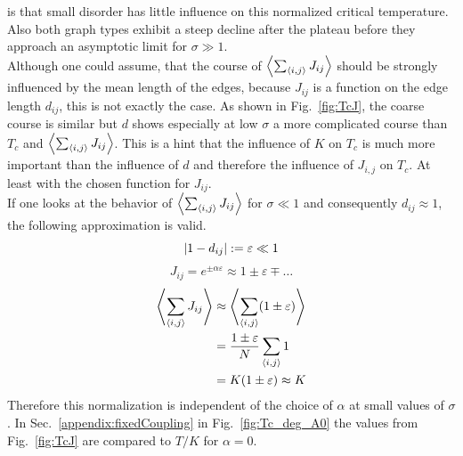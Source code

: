         is that small disorder has little influence on this normalized critical
        temperature.
        Also both graph types exhibit a steep decline after the plateau before
        they approach an asymptotic limit for \(\sigma \gg 1\).\\
        Although one could assume, that the course of \(\left< \sum_{\left< i,j \right>} J_{ij} \right>\)
        should be strongly influenced by the mean length of the edges, because \(J_{ij}\)
        is a function on the edge length \(d_{ij}\), this is not exactly the case.
        As shown in Fig.\ \ref{fig:TcJ}, the
        coarse course is similar but \(d\) shows especially at low \(\sigma\)
        a more complicated course than \(T_c\) and \(\left< \sum_{\left< i,j \right>} J_{ij} \right>\).
        This is a hint that the influence of \(K\) on \(T_c\) is much more
        important than the influence of \(d\) and therefore the influence
        of \(J_{i,j}\) on \(T_c\). At least with the chosen function for \(J_{ij}\).\\
        If one looks at the behavior of \(\left< \sum_{\left< i,j \right>} J_{ij} \right>\)
        for \(\sigma \ll 1\) and consequently \(d_{ij} \approx 1\), the
        following approximation is valid.
        \begin{equation}
            \left\vert1-d_{ij}\right\vert := \varepsilon \ll 1
        \end{equation}
        \begin{equation}
            J_{ij} = e^{\pm \alpha \varepsilon} \approx 1 \pm \varepsilon \mp \dots
        \end{equation}
        \begin{align}
            \left< \sum_{\left< i,j \right>} J_{ij} \right> &\approx \left< \sum_{\left< i,j \right>} (1 \pm \varepsilon) \right> \\
                                          &= \frac{1 \pm \varepsilon}{N} \sum_{\left< i,j \right>} 1 \\
                                          &= K(1 \pm \varepsilon) \approx K
        \end{align}
        Therefore this normalization is independent of the choice of \(\alpha\)
        at small values of \(\sigma\). In Sec.\ \ref{appendix:fixedCoupling}
        in Fig.\ \ref{fig:Tc_deg_A0}
        the values from Fig.\ \ref{fig:TcJ}
        are compared to \(T / K\) for \(\alpha = 0\).

